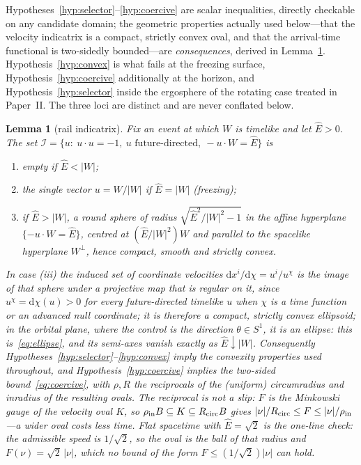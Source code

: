 \documentclass[12pt]{iopart}
\newcommand{\Ehat}{\hat E}
\newcommand{\dd}{\mathrm{d}}
\theoremstyle{plain}
\theoremstyle{definition}
\theoremstyle{plain}
\newtheorem{auxlemma}{Lemma}
\theoremstyle{remark}
\begin{document}
Hypotheses~\ref{hyp:selector}--\ref{hyp:coercive} are scalar inequalities, directly
checkable on any candidate domain; the geometric properties actually used below---that the
velocity indicatrix is a compact, strictly convex oval, and that the arrival-time
functional is two-sidedly bounded---are \emph{consequences}, derived in
Lemma~\ref{lem:indicatrix}. Hypothesis~\ref{hyp:convex} is what fails at the freezing
surface, Hypothesis~\ref{hyp:coercive} additionally at the horizon, and
Hypothesis~\ref{hyp:selector} inside the ergosphere of the rotating case treated in
Paper~II. The three loci are distinct and are never conflated below.

\begin{auxlemma}[rail indicatrix]\label{lem:indicatrix}
Fix an event at which $W$ is timelike and let $\Ehat>0$. The set
$\mathcal I=\{u:\ u\cdot u=-1,\ u \text{ future-directed},\ -u\cdot W=\Ehat\}$ is
\begin{enumerate}
\item[(i)] empty if $\Ehat<|W|$;
\item[(ii)] the single vector $u=W/|W|$ if $\Ehat=|W|$ \emph{(freezing)};
\item[(iii)] if $\Ehat>|W|$, a round sphere of radius $\sqrt{\Ehat^2/|W|^2-1}$ in the
affine hyperplane $\{-u\cdot W=\Ehat\}$, centred at $(\Ehat/|W|^2)W$ and parallel to the
spacelike hyperplane $W^\perp$, hence compact, smooth and strictly convex.
\end{enumerate}
In case (iii) the induced set of coordinate velocities $\dd x^i/\dd\chi=u^i/u^\chi$ is the
image of that sphere under a projective map that is regular on it, since
$u^\chi=\dd\chi(u)>0$ for every future-directed timelike $u$ when $\chi$ is a time function
or an advanced null coordinate; it is therefore a compact, strictly convex ellipsoid; in
the orbital plane, where the control is the direction $\theta\in S^1$, it is an ellipse: this
is~\eqref{eq:ellipse}, and its semi-axes vanish exactly as $\Ehat\downarrow|W|$.
Consequently Hypotheses~\ref{hyp:selector}--\ref{hyp:convex} imply the convexity properties
used throughout, and Hypothesis~\ref{hyp:coercive} implies the two-sided
bound~\eqref{eq:coercive}, with $\rho,R$ the \emph{reciprocals} of the (uniform)
circumradius and inradius of the resulting ovals. The reciprocal is not a slip:
$F$ is the Minkowski gauge of the velocity oval $K$, so $\rho_{\rm in}B\subseteq
K\subseteq R_{\rm circ}B$ gives $|\nu|/R_{\rm circ}\le F\le|\nu|/\rho_{\rm in}$---a
\emph{wider} oval costs \emph{less} time. Flat spacetime with $\Ehat=\sqrt2$ is the
one-line check: the admissible speed is $1/\sqrt2$, so the oval is the ball of that
radius and $F(\nu)=\sqrt2\,|\nu|$, which no bound of the form $F\le(1/\sqrt2)|\nu|$
can hold.
\end{auxlemma}
\end{document}
